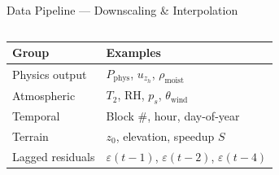 \documentclass[aspectratio=169,10pt]{beamer}
\begin{document}
\begin{frame}{Data Pipeline — Downscaling \& Interpolation}
\begin{columns}[T]
      \vspace{6pt}
      \begin{tcolorbox}[greenbox, title={\faBrain\; XGBoost Feature Groups}]
        \begin{tabular}{@{}ll@{}}
          \tiny\textbf{Group} & \tiny\textbf{Examples} \\
          \midrule
          \tiny Physics output & \tiny $P_\text{phys}$, $u_{z_h}$, $\rho_\text{moist}$ \\
          \tiny Atmospheric & \tiny $T_2$, RH, $p_s$, $\theta_\text{wind}$ \\
          \tiny Temporal & \tiny Block \#, hour, day-of-year \\
          \tiny Terrain & \tiny $z_0$, elevation, speedup $S$ \\
          \tiny Lagged residuals & \tiny $\varepsilon(t{-}1)$, $\varepsilon(t{-}2)$, $\varepsilon(t{-}4)$ \\
        \end{tabular}
      \end{tcolorbox}
  \end{columns}
\end{frame}
\end{document}
